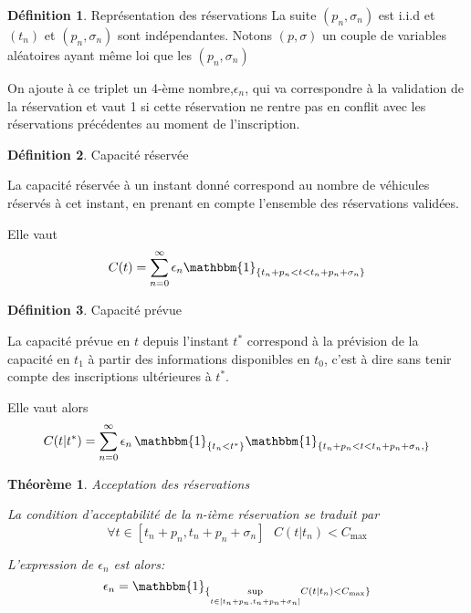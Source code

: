 \documentclass[12pt,a4paper]{article}
\newcommand{\1}[1]{\mathbbm{1}_{\{#1\}} }
\newtheorem{theorem}{Théorème}
\theoremstyle{definition}
\newtheorem{definition}{Définition}
\begin{document}
{\begin{definition}{Représentation des réservations}
La suite $(p_n,\sigma_n)$ est i.i.d et $(t_n)$ et $(p_n,\sigma_n)$ sont indépendantes. Notons $(p,\sigma)$ un couple de variables aléatoires ayant même loi que les  $(p_n,\sigma_n)$

On ajoute à ce triplet un 4-ème nombre,$\epsilon_n$, qui va correspondre à la validation de la réservation et vaut 1 si cette réservation ne rentre pas en conflit avec les réservations précédentes au moment de l'inscription.
\end{definition}

\begin{definition}{Capacité réservée}

La capacité réservée à un instant donné correspond au nombre de véhicules réservés à cet instant, en prenant en compte l'ensemble des réservations validées.

Elle vaut
\begin{equation}
C(t) = \sum_{n=0}^{\infty} \epsilon_n \mathbbm{1}_{\{t_n+p_n<t<t_n+p_n+\sigma_n\}}
\end{equation}

\end{definition}



\begin{definition}{Capacité prévue}

La capacité prévue en $t$ depuis l'instant $t^{*}$ correspond à la prévision de la capacité en $t_1$ à partir des informations disponibles en $t_0$, c'est à dire sans tenir compte des inscriptions ultérieures à $t^*$.

Elle vaut alors
\begin{equation}
C(t|t^{*}) = \sum_{n=0}^{\infty} \epsilon_n\,\1{t_n<t^*}\mathbbm{1}_{\{t_n+p_n<t<t_n+p_n+\sigma_n,\}}
\end{equation}

\end{definition}


\begin{theorem}{Acceptation des réservations}

La condition d'acceptabilité de la n-ième réservation se traduit par
\begin{equation}
\forall t \in [t_n+p_n,t_n+p_n+\sigma_n]\,\,\,\, C(t|t_n) < C_{\max}
\end{equation}

L'expression de $\epsilon_n$ est alors:
\begin{equation}
\epsilon_n = \1{\underset{t \in [t_n+p_n,t_n+p_n+\sigma_n]}{\sup} C(t|t_n) < C_{\max}}
\end{equation}
\end{theorem}

}
\end{document}
